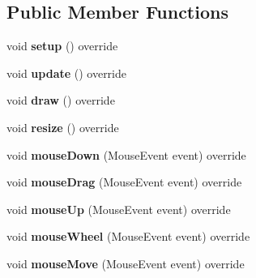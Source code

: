 \subsection*{Public Member Functions}
\begin{DoxyCompactItemize}
\item 
\mbox{\label{classpepr3d_1_1_main_application_a5b6116d8f876a0ffe82ac50a79699a80}} 
void {\bfseries setup} () override
\item 
\mbox{\label{classpepr3d_1_1_main_application_aaeaff9b43639879dc3f318c97ae28a78}} 
void {\bfseries update} () override
\item 
\mbox{\label{classpepr3d_1_1_main_application_abc78d4bf492874de9bfd6f38fdc0a9d1}} 
void {\bfseries draw} () override
\item 
\mbox{\label{classpepr3d_1_1_main_application_aa65c16b49a329894f4c11e8ec170ff77}} 
void {\bfseries resize} () override
\item 
\mbox{\label{classpepr3d_1_1_main_application_a6f78d23316feefe9fa47d175945a9539}} 
void {\bfseries mouse\+Down} (Mouse\+Event event) override
\item 
\mbox{\label{classpepr3d_1_1_main_application_a37906240fbe8298da4cee85823beb9d3}} 
void {\bfseries mouse\+Drag} (Mouse\+Event event) override
\item 
\mbox{\label{classpepr3d_1_1_main_application_acbb75130b69f0da2f12f87322e976fd5}} 
void {\bfseries mouse\+Up} (Mouse\+Event event) override
\item 
\mbox{\label{classpepr3d_1_1_main_application_a80d67681ea10a5ed21bc8c5004f1ad94}} 
void {\bfseries mouse\+Wheel} (Mouse\+Event event) override
\item 
\mbox{\label{classpepr3d_1_1_main_application_afe0f99dcc618f5820a9f947bde3fd14b}} 
void {\bfseries mouse\+Move} (Mouse\+Event event) override
\item 

\end{DoxyCompactItemize}

